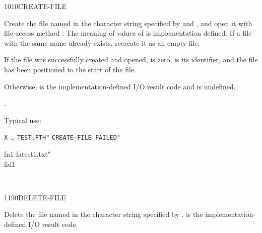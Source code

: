 \begin{worddef}{1010}{CREATE-FILE}
\item {}

	Create the file named in the character string specified by
	 and , and open it with file access method
	. The meaning of values of  is
	implementation defined. If a file with the same name already
	exists, recreate it as an empty file.

	If the file was successfully created and opened,  is
	zero,  is its identifier, and the file has been
	positioned to the start of the file.

	Otherwise,  is the implementation-defined I/O result
	code and  is undefined.

\see {}.

	\begin{rationale} %
		Typical use:

		\tab \word[core]{:} \texttt{X} {\ldots}
				 \texttt{TEST.FTH"} 
				 \texttt{CREATE-FILE FAILED"}
			\word[core]{;}
	\end{rationale}

	\begin{testing}\ttfamily
		\word{:} fn1  fatest1.txt" \word{;} \\
		 fid1

		 \\
	\end{testing}
\end{worddef}


\begin{worddef}{1190}{DELETE-FILE}
\item {}

	Delete the file named in the character string specified by
	.  is the {im\-ple\-ment\-ation-de\-fin\-ed}
	I/O result code.

	\begin{testing}
		 \\
		 \\
	\end{testing}
\end{worddef}



